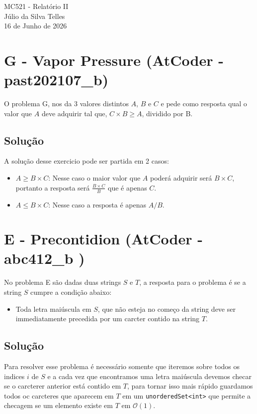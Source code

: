 \documentclass[12pt,a4paper]{article}
\begin{document}
\begin{center}
    {\LARGE MC521 - Relatório II} \\ [2,5em]
    {\large Júlio da Silva Telles} \\ [1,0em]
    {\large 16 de Junho de 2026} \\ [1,5em]
\end{center}

\vspace{1cm} 

\section{G - Vapor Pressure (AtCoder - past202107\_b)}

O problema G, nos da 3 valores distintos $A$, $B$ e $C$ e pede como resposta qual o valor que $A$ deve adquirir tal que,
$C \times B \geq A$, dividido por B.

\subsection{Solução}

A solução desse exercicio pode ser partida em 2 casos:

\begin{itemize}
    \item $A \geq B \times C$: Nesse caso o maior valor que $A$ poderá adquirir será $B \times C$, portanto a resposta será $\frac{B \times C}{B}$ que é apenas $C$.
    \item $A \le B \times C$: Nesse caso a resposta é apenas $A / B$.
\end{itemize}

\section{E - Precontidion (AtCoder - abc412\_b )}

No problema E são dadas duas strings $S$ e $T$, a resposta  para o problema é se a string $S$ cumpre a condição abaixo:

\begin{itemize}
    \item Toda letra maiúscula em $S$, que não esteja no começo da string deve ser immediatamente precedida por um carcter contido na string $T$.
\end{itemize}

\subsection{Solução}

Para resolver esse problema é necessário somente que iteremos sobre todos os indices $i$ de $S$ e a cada vez que encontramos uma letra maiúscula devemos
checar se o carcterer anterior está contido em $T$, para tornar isso mais rápido guardamos todos oc carcteres que aparecem em $T$ em um \texttt{unorderedSet<int>}
que permite a checagem se um elemento existe em $T$ em $\mathcal{O}(1)$.
\end{document}

